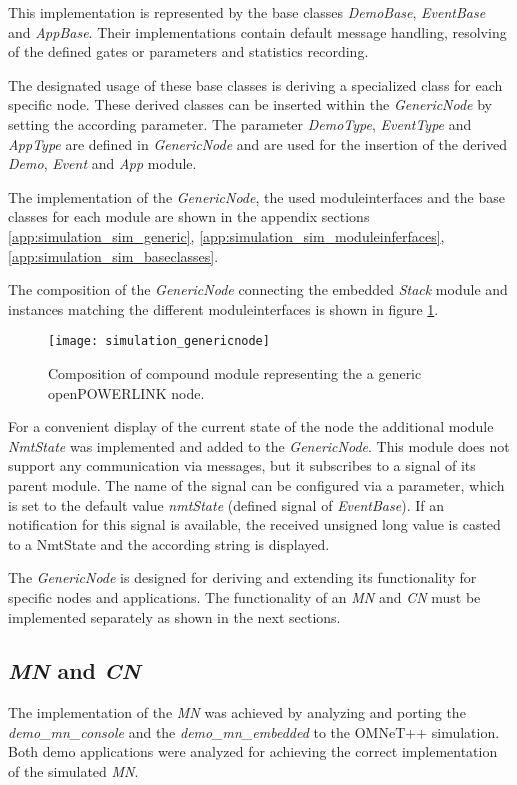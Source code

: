 This implementation is represented by the base classes \emph{DemoBase}, \emph{EventBase} and \emph{AppBase}.
Their implementations contain default message handling, resolving of the defined gates or parameters and statistics recording.

The designated usage of these base classes is deriving a specialized class for each specific node.
These derived classes can be inserted within the \emph{GenericNode} by setting the according parameter.
The parameter \emph{DemoType}, \emph{EventType} and \emph{AppType} are defined in \emph{GenericNode} and are used for the insertion of the derived \emph{Demo}, \emph{Event} and \emph{App} module.

The implementation of the \emph{GenericNode}, the used moduleinterfaces and the base classes for each module are shown in the appendix sections \ref{app:simulation_sim_generic}, \ref{app:simulation_sim_moduleinferfaces}, \ref{app:simulation_sim_baseclasses}.

The composition of the \emph{GenericNode} connecting the embedded \emph{Stack} module and instances matching the different moduleinterfaces is shown in figure \ref{fig:simulation_genericnode}.

\begin{figure}
    \centering
    \texttt{[image: simulation\_genericnode]}
    \caption{Composition of compound module representing the a generic openPOWERLINK node.}
    \label{fig:simulation_genericnode}
\end{figure}

For a convenient display of the current state of the node the additional module \emph{NmtState} was implemented and added to the \emph{GenericNode}.
This module does not support any communication via messages, but it subscribes to a signal of its parent module.
The name of the signal can be configured via a parameter, which is set to the default value \emph{nmtState} (defined signal of \emph{EventBase}).
If an notification for this signal is available, the received unsigned long value is casted to a NmtState and the according string is displayed.

The \emph{GenericNode} is designed for deriving and extending its functionality for specific nodes and applications.
The functionality of an \emph{MN} and \emph{CN} must be implemented separately as shown in the next sections.

\subsection{\emph{MN} and \emph{CN}}
\label{sec:porting_nodes_mn_cm}
The implementation of the \emph{MN} was achieved by analyzing and porting the \emph{demo\_mn\_console} and the \emph{demo\_mn\_embedded} to the OMNeT++ simulation.
Both demo applications were analyzed for achieving the correct implementation of the simulated \emph{MN}.

